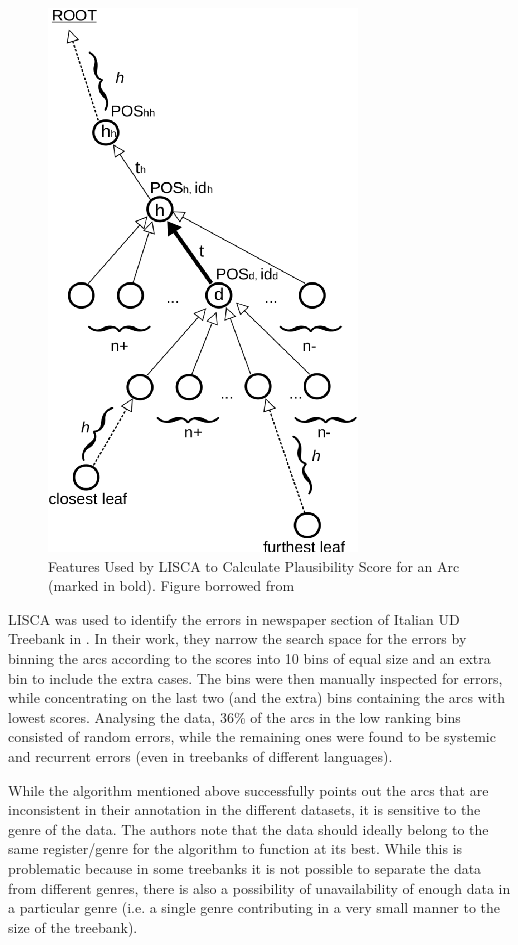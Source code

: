 \begin{figure}[H]
    \centering
    \includegraphics[scale=0.5]{img/lisca_stats.png}
    \caption[Features Used by LISCA to Calculate Plausibility Score for an Arc]{Features Used by LISCA to Calculate Plausibility Score for an Arc (marked in bold). Figure borrowed from \cite{alzetta2017dangerous}}
    \label{fig:lisca_stats}
\end{figure}

LISCA was used to identify the errors in newspaper section of Italian UD Treebank in \cite{alzetta2017dangerous}. In their work, they narrow the search space for the errors by binning the arcs according to the scores into 10 bins of equal size and an extra bin to include the extra cases. The bins were then manually inspected for errors, while concentrating on the last two (and the extra) bins containing the arcs with lowest scores. Analysing the data, 36\% of the arcs in the low ranking bins consisted of random errors, while the remaining ones were found to be systemic and recurrent errors (even in treebanks of different languages).

While the algorithm mentioned above successfully points out the arcs that are inconsistent in their annotation in the different datasets, it is sensitive to the genre of the data. The authors note that the data should ideally belong to the same register/genre for the algorithm to function at its best. While this is problematic because in some treebanks it is not possible to separate the data from different genres, there is also a possibility of unavailability of enough data in a particular genre (i.e. a single genre contributing in a very small manner to the size of the treebank).

